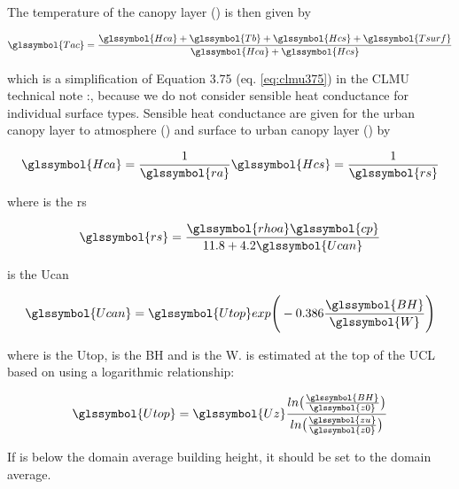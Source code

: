 \documentclass[final,3p,times,authoryear]{elsarticle}
\begin{document}
The temperature of the canopy layer () is then given by \citep{Oleson2010} 

\begin{equation} 
\glssymbol{Tac} = \frac{\glssymbol{Hca} + \glssymbol{Tb} + \glssymbol{Hcs} + \glssymbol{Tsurf} }  { \glssymbol{Hca}  + \glssymbol{Hcs} }
\label{eq:tac} \end{equation}

which is a simplification of Equation 3.75 (eq. \ref{eq:clmu375}) in the CLMU technical note \citep{Oleson2010}:, because we do not consider sensible heat conductance for individual surface types. Sensible heat conductance are given for the urban canopy layer to atmosphere () and surface to urban canopy layer () by \citep{Oleson2010}



\begin{equation} 
\glssymbol{Hca} = \frac{1}{\glssymbol{ra}} \glssymbol{Hcs} = \frac{1}{\glssymbol{rs}}
\label{eq:hca} \end{equation}

where  is the \glsdesc{rs}

\begin{equation} 
\glssymbol{rs} = \frac{\glssymbol{rhoa}\glssymbol{cp}}{11.8+4.2\glssymbol{Ucan}}
\label{eq:rs} \end{equation}
 				
 is the \glsdesc{Ucan}


\begin{equation} 
\glssymbol{Ucan} = \glssymbol{Utop} exp{ \Bigg( -0.386 \frac{\glssymbol{BH}}{\glssymbol{W}} \Bigg)}
\label{eq:ucan} \end{equation}

where  is the \glsdesc{Utop},  is the \glsdesc{BH} and  is the \glsdesc{W}.  is estimated at the top of the UCL based on  using a logarithmic relationship:




\begin{equation} 
\glssymbol{Utop} = \glssymbol{Uz} \frac{ ln \big( \frac{\glssymbol{BH}}{\glssymbol{z0}}  \big)}{ ln \big( \frac{\glssymbol{zu}}{\glssymbol{z0}}  \big) }
\label{eq:xx4} \end{equation}

If  is below the domain average building height, it should be set to the domain average. 
\end{document}
